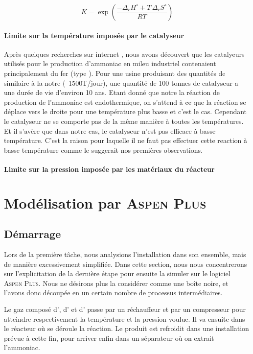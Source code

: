 \documentclass[a4paper, oneside, 12pt]{article}
\begin{document}
\[
K = \exp{\left( \frac{- \Delta_r H^{\circ} + T \, \Delta_r S^{\circ}}{R T}\right)}
\]

\paragraph{Limite sur la température imposée par le catalyseur}

Après quelques recherches sur internet \cite{catalyseur}, nous avons découvert que les catalyeurs utilisés
pour le production d'ammoniac en mileu industriel contenaient principalement du fer (type ). 
Pour une usine produisant des quantités de  similaire à la notre (~1500T/jour), une quantité de 100 tonnes
de catalyseur a une durée de vie d'environ 10 ans. Etant donné que notre la réaction de production de l'ammoniac est
endothermique, on s'attend à ce que la réaction se déplace vers le droite pour une température plus basse et c'est le cas.
Cependant le catalyseur ne se comporte pas de la m\^eme manière à toutes les températures. Et il s'avère que dans notre
cas, le catalyseur n'est pas efficace à basse température. C'est la raison pour laquelle il ne faut pas effectuer
cette reaction à basse température comme le suggerait nos premières observations.

\paragraph{Limite sur la pression imposée par les matériaux du réacteur}

\section{Modélisation par \textsc{Aspen Plus}}
\subsection{Démarrage}

Lors de la première tâche, nous analysions l'installation dans son ensemble, 
mais de manière excessivement simplifiée. 
Dans cette section, nous nous concentrerons sur l'explicitation de la dernière étape 
pour ensuite la simuler sur le logiciel \textsc{Aspen Plus}. 
Nous ne désirons plus la considérer comme une boîte noire, et l'avons donc découpée 
en un certain nombre de processus intermédiaires. 

Le gaz composé d', d' et d' passe par un réchauffeur 
et par un compresseur pour atteindre respectivement la température et la pression voulue. 
Il va ensuite dans le réacteur où se déroule la réaction.
Le produit est refroidit dans une installation prévue à cette fin, 
pour arriver enfin dans un séparateur où on extrait l'ammoniac.
\end{document}
